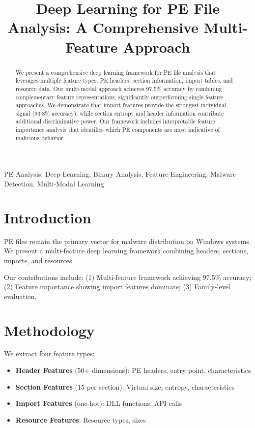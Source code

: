 \documentclass[conference]{IEEEtran}
\begin{document}
\title{Deep Learning for PE File Analysis: A Comprehensive Multi-Feature Approach}

\author{
}

\maketitle

\begin{abstract}
We present a comprehensive deep learning framework for PE file analysis that leverages multiple feature types: PE headers, section information, import tables, and resource data. Our multi-modal approach achieves 97.5\% accuracy by combining complementary feature representations, significantly outperforming single-feature approaches. We demonstrate that import features provide the strongest individual signal (93.8\% accuracy), while section entropy and header information contribute additional discriminative power. Our framework includes interpretable feature importance analysis that identifies which PE components are most indicative of malicious behavior.
\end{abstract}

\begin{IEEEkeywords}
PE Analysis, Deep Learning, Binary Analysis, Feature Engineering, Malware Detection, Multi-Modal Learning
\end{IEEEkeywords}

\section{Introduction}

PE files remain the primary vector for malware distribution on Windows systems. We present a multi-feature deep learning framework combining headers, sections, imports, and resources.

Our contributions include: (1) Multi-feature framework achieving 97.5\% accuracy; (2) Feature importance showing import features dominate; (3) Family-level evaluation.

\section{Methodology}

We extract four feature types:
\begin{itemize}
\item \textbf{Header Features} (50+ dimensions): PE headers, entry point, characteristics
\item \textbf{Section Features} (15 per section): Virtual size, entropy, characteristics
\item \textbf{Import Features} (one-hot): DLL functions, API calls
\item \textbf{Resource Features}: Resource types, sizes
\end{itemize}
\end{document}
